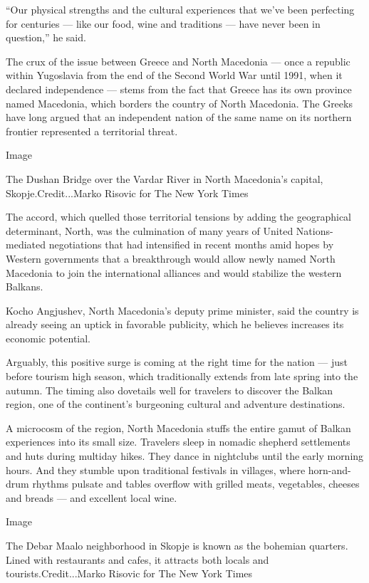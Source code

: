 ``Our physical strengths and the cultural experiences that we've been
perfecting for centuries --- like our food, wine and traditions --- have
never been in question,'' he said.

The crux of the issue between Greece and North Macedonia --- once a
republic within Yugoslavia from the end of the Second World War until
1991, when it declared independence --- stems from the fact that Greece
has its own province named Macedonia, which borders the country of North
Macedonia. The Greeks have long argued that an independent nation of the
same name on its northern frontier represented a territorial threat.

Image

The Dushan Bridge over the Vardar River in North Macedonia's capital,
Skopje.Credit...Marko Risovic for The New York Times

The accord, which quelled those territorial tensions by adding the
geographical determinant, North, was the culmination of many years of
United Nations-mediated negotiations that had intensified in recent
months amid hopes by Western governments that a breakthrough would allow
newly named North Macedonia to join the international alliances and
would stabilize the western Balkans.

Kocho Angjushev, North Macedonia's deputy prime minister, said the
country is already seeing an uptick in favorable publicity, which he
believes increases its economic potential.

Arguably, this positive surge is coming at the right time for the nation
--- just before tourism high season, which traditionally extends from
late spring into the autumn. The timing also dovetails well for
travelers to discover the Balkan region, one of the continent's
burgeoning cultural and adventure destinations.

A microcosm of the region, North Macedonia stuffs the entire gamut of
Balkan experiences into its small size. Travelers sleep in nomadic
shepherd settlements and huts during multiday hikes. They dance in
nightclubs until the early morning hours. And they stumble upon
traditional festivals in villages, where horn-and-drum rhythms pulsate
and tables overflow with grilled meats, vegetables, cheeses and breads
--- and excellent local wine.

Image

The Debar Maalo neighborhood in Skopje is known as the bohemian
quarters. Lined with restaurants and cafes, it attracts both locals and
tourists.Credit...Marko Risovic for The New York Times

